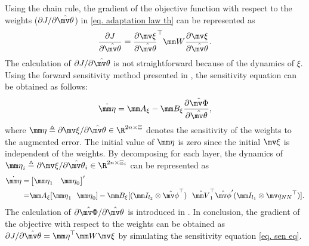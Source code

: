 \documentclass[letterpaper, 10 pt, conference]{ieeeconf}  %
\begin{document}
Using the chain rule, the gradient of the objective function with respect to the weights (\ie $\partial J/\partial {\hat{\mv\theta}}$) in \eqref{eq. adaptation law th} can be represented as
\begin{equation}
    {\partial J\over\partial {\hat{\mv\theta}}}
    =
    {\partial \mv\xi\over\partial {\hat{\mv\theta}}}^\top 
    \mm W
    {\partial \mv\xi\over\partial {\hat{\mv\theta}}}
    .
\end{equation}
The calculation of $\partial J/\partial {\hat{\mv\theta}}$ is not straightforward because of the dynamics of $\xi$.
Using the forward sensitivity method presented in \cite{Sengupta:2014aa}, the sensitivity equation can be obtained as follows:
\begin{equation}
    \dot {\mm \eta} =
    \mm A_\xi - \mm B_\xi 
    {\partial \hat{\mv\Phi}\over\partial {\hat{\mv\theta}}}
    ,
    \label{eq. sen eq}
\end{equation}
where ${\mm \eta}\triangleq \partial \mv\xi/\partial {\hat{\mv\theta}}\in\R^{2n\times \Xi}$ denotes the sensitivity of the weights to the augmented error.
The initial value of ${\mm \eta}$ is zero since the initial $\mv\xi$ is independent of the weights.
By decomposing for each layer, the dynamics of ${\mm \eta}_i\triangleq \partial \mv\xi/\partial {\hat{\mv\theta}}_i\in\R^{2n\times \Xi_i}$ can be represented as
\begin{equation}
    \begin{aligned}
        \dot{\mm \eta} =&
        \begin{bmatrix}
            {\mm \eta}_1&{\mm \eta}_0
        \end{bmatrix}'
        \\
        =&
        \mm A_\xi
        [
            {\mm \eta}_1
            \ \ 
            {\mm \eta}_0
        ]
        -\mm B_\xi
        [
            (\mm I_{l_2}\otimes \hat{\mv\phi}^\top )
            \ \ 
            \hat {\mm V}_1^\top \hat{\mv\phi}'(\mm I_{l_1}\otimes {\mv q_{NN}}^\top )
        ]
        .
    \end{aligned}
\end{equation}
The calculation of $\partial \hat{\mv\Phi}/\partial{\hat{\mv\theta}}$ is introduced in \cite{Patil:2022aa}.
In conclusion, the gradient of the objective with respect to the weights can be obtained as ${\partial J/\partial {\hat{\mv\theta}}} = {\mm \eta}^\top\mm W\mv\xi$ by simulating the sensitivity equation \eqref{eq. sen eq}.
\end{document}
